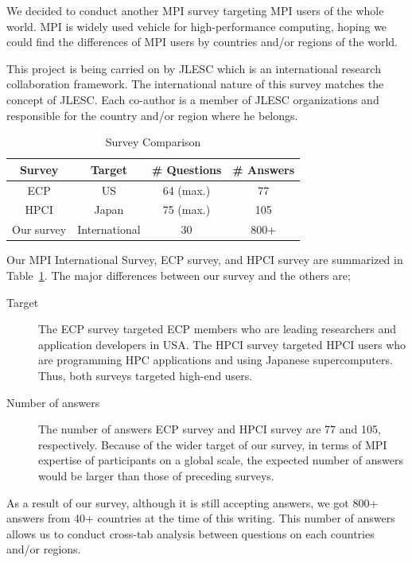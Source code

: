 \documentclass[submit,techrep,noauthor,english]{ipsj}
\begin{document}
We decided to conduct another MPI survey targeting MPI users of the
whole world. MPI is widely used vehicle for high-performance
computing, hoping we could find the differences of MPI users by
countries and/or regions of the world.

This project is being carried on by JLESC\cite{JLESC} which is an
international research collaboration framework. The international
nature of this survey matches the concept of JLESC. Each co-author is
a member of JLESC organizations and responsible for the country and/or
region where he belongs. 

\begin{table}[htb]%
\begin{center}%
\caption{Survey Comparison}\label{tab:comparison}%
\begin{tabular}{c|ccc}%
\hline%
Survey & Target & \# Questions & \# Answers \\%
\hline%
ECP  & US & 64 (max.) & 77 \\
HPCI & Japan & 75 (max.) & 105 \\
\hline
Our survey & International & 30 & 800+ \\
\hline%
\end{tabular}%
\end{center}%
\end{table}%

Our MPI International Survey, ECP survey, and HPCI survey are
summarized in Table~\ref{tab:comparison}. The major differences
between our survey and the others are;

\begin{description}
\item[Target]
  The ECP survey targeted ECP members who are leading researchers and
  application developers in USA. The HPCI survey targeted HPCI users
  who are programming HPC applications and using Japanese
  supercomputers. Thus, both surveys targeted high-end users. 
\item[Number of answers]
  The number of answers ECP survey and HPCI survey are 77 and 105,
  respectively. Because of the wider target of our survey, in terms of
  MPI expertise of participants on a global scale, the expected number of
  answers would be larger than those of preceding surveys.
\end{description}

As a result of our survey, although it is still accepting answers, we
got 800+ answers from 40+ countries at the time of this writing.  This
number of answers allows us to conduct cross-tab analysis between
questions on each countries and/or regions.
\end{document}
